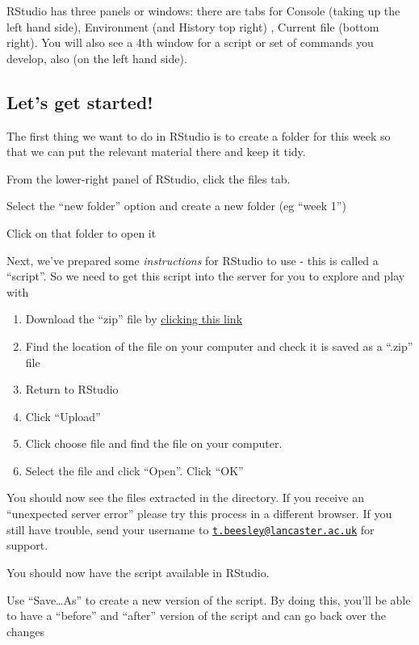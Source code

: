 \documentclass[
]{book}
\begin{document}
RStudio has three panels or windows: there are tabs for Console (taking up the left hand side), Environment (and History top right) , Current file (bottom right). You will also see a 4th window for a script or set of commands you develop, also (on the left hand side).

\hypertarget{lets-get-started}{%
\subsection{Let's get started!}\label{lets-get-started}}

The first thing we want to do in RStudio is to create a folder for this week so that we can put the relevant material there and keep it tidy.

From the lower-right panel of RStudio, click the files tab.

Select the ``new folder'' option and create a new folder (eg ``week 1'')

Click on that folder to open it

Next, we've prepared some \emph{instructions} for RStudio to use - this is called a ``script''. So we need to get this script into the server for you to explore and play with

\begin{enumerate}
\def\labelenumi{\arabic{enumi}.}
\item
  Download the ``zip'' file by \href{files/Week_1/week_1.zip}{clicking this link}
\item
  Find the location of the file on your computer and check it is saved as a ``.zip'' file
\item
  Return to RStudio
\item
  Click ``Upload''
\item
  Click choose file and find the file on your computer.
\item
  Select the file and click ``Open''. Click ``OK''
\end{enumerate}

You should now see the files extracted in the directory. If you receive an ``unexpected server error'' please try this process in a different browser. If you still have trouble, send your username to \href{mailto:t.beesley@lancaster.ac.uk}{\nolinkurl{t.beesley@lancaster.ac.uk}} for support.

You should now have the script available in RStudio.

Use ``Save\ldots As'' to create a new version of the script. By doing this, you'll be able to have a ``before'' and ``after'' version of the script and can go back over the changes
\end{document}
